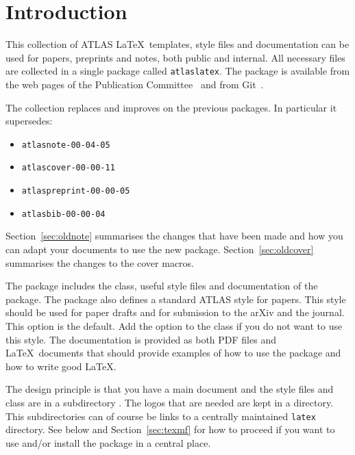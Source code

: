 
\section{Introduction}
\label{sec:intro}

This collection of ATLAS \LaTeX\ templates, style files and documentation
can be used for papers, preprints and notes, both public and internal. 
All necessary files are collected in a single package called \texttt{atlaslatex}.
The package is available from the web pages of the Publication Committee~\cite{pubcom} and from 
Git~\cite{pubcom-git}.

The collection replaces and improves on the previous packages. 
In particular it supersedes:
\begin{itemize}\setlength{\parskip}{0pt}\setlength{\itemsep}{0pt}
\item \texttt{atlasnote-00-04-05}
\item \texttt{atlascover-00-00-11}
\item \texttt{atlaspreprint-00-00-05}
\item \texttt{atlasbib-00-00-04}
\end{itemize}
Section~\ref{sec:oldnote} summarises the changes that have been made and
how you can adapt your documents to use the new package.
Section~\ref{sec:oldcover} summarises the changes to the cover macros.

The package includes the  class, useful style files
and documentation of the package.
The package also defines a standard ATLAS style for papers.
This style should be used for paper drafts and for submission to the arXiv and the journal.
This option is the default. Add the option  to the  class if you do not want to use this style.
The documentation is provided as both PDF files and \LaTeX\ documents
that should provide examples of how to use the package and how to write
good \LaTeX.

The design principle is that you have a main document and 
the style files and  class are in a subdirectory .
The logos that are needed are kept in a  directory.
This subdirectories can of course be links to a centrally maintained \texttt{latex} directory.
See below and Section~\ref{sec:texmf} for how to proceed if you want to use and/or install
the package in a central place.

